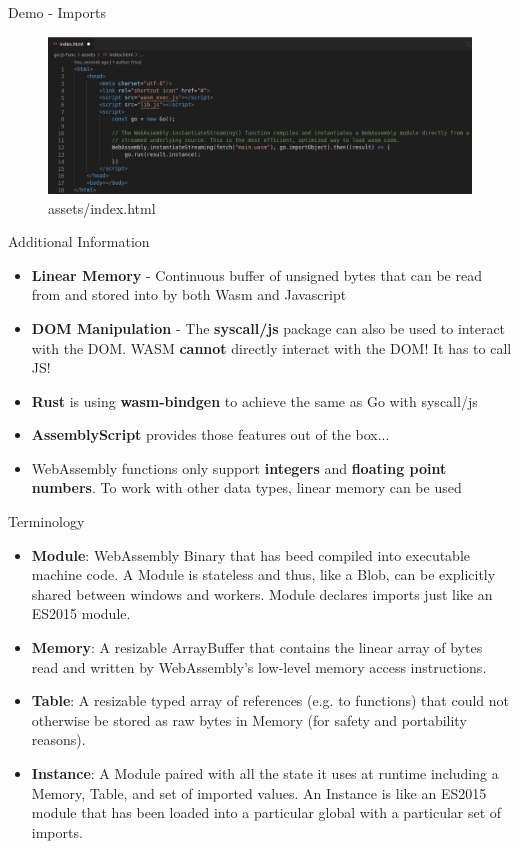\documentclass{beamer}
\begin{document}
\begin{frame}{Demo - Imports}
    \begin{figure}
        \includegraphics[scale=0.2]{./images/importindex.png}
        \caption{assets/index.html}
    \end{figure}
\end{frame}

\begin{frame}{Additional Information}
    \begin{itemize}
        \item \textbf{Linear Memory} - Continuous buffer of unsigned bytes that can be read from and stored into by both Wasm and Javascript
        \item \textbf{DOM Manipulation} - The \textbf{syscall/js} package can also be used to interact with the DOM. WASM \textbf{cannot} directly interact with the DOM! It has to call JS!
        \item \textbf{Rust} is using \textbf{wasm-bindgen} to achieve the same as Go with syscall/js
        \item \textbf{AssemblyScript} provides those features out of the box...
        \item WebAssembly functions only support \textbf{integers} and \textbf{floating point numbers}. To work with other data types, linear memory can be used
    \end{itemize}
\end{frame}

\begin{frame}{Terminology}
    \begin{itemize}
        \item \textbf{Module}: WebAssembly Binary that has beed compiled into executable machine code. A Module is stateless and thus, like a Blob, can be explicitly shared between windows and workers. Module declares imports just like an ES2015 module.
        \item \textbf{Memory}: A resizable ArrayBuffer that contains the linear array of bytes read and written by WebAssembly’s low-level memory access instructions.
        \item \textbf{Table}: A resizable typed array of references (e.g. to functions) that could not otherwise be stored as raw bytes in Memory (for safety and portability reasons).
        \item \textbf{Instance}: A Module paired with all the state it uses at runtime including a Memory, Table, and set of imported values. An Instance is like an ES2015 module that has been loaded into a particular global with a particular set of imports.
    \end{itemize}
\end{frame}
\end{document}
